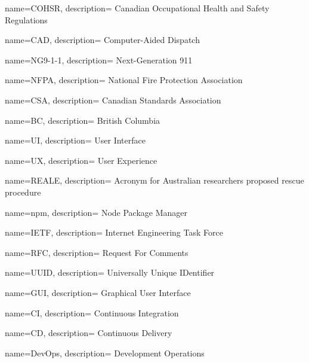 {
  name={COHSR},
  description={
    Canadian Occupational Health and Safety Regulations
  }
}

{
  name={CAD},
  description={
    Computer-Aided Dispatch
  }
}

{
  name={NG9-1-1},
  description={
    Next-Generation 911
  }
}

{
  name={NFPA},
  description={
    National Fire Protection Association
  }
}

{
  name={CSA},
  description={
    Canadian Standards Association
  }
}

{
  name={BC},
  description={
    British Columbia
  }
}

{
  name={UI},
  description={
    User Interface
  }
}

{
  name={UX},
  description={
    User Experience
  }
}

{
  name={REALE},
  description={
    Acronym for Australian researchers proposed rescue procedure
  }
}

{
  name={npm},
  description={
    Node Package Manager
  }
}

{
  name={IETF},
  description={
    Internet Engineering Task Force
  }
}

{
  name={RFC},
  description={
    Request For Comments
  }
}

{
  name={UUID},
  description={
    Universally Unique IDentifier
  }
}

{
  name={GUI},
  description={
    Graphical User Interface
  }
}

{
  name={CI},
  description={
    Continuous Integration
  }
}

{
  name={CD},
  description={
    Continuous Delivery
  }
}

{
  name={DevOps},
  description={
    Development Operations
  }
}
